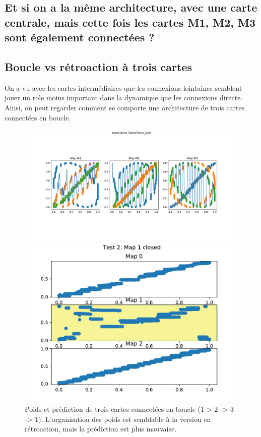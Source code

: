\subsection{Et si on a la même architecture, avec une carte centrale, mais cette fois les cartes M1, M2, M3 sont également connectées ?}



\subsection{Boucle vs rétroaction à trois cartes}
On a vu avec les cartes intermédiaires que les connexions lointaines semblent jouer un role moins important dans la dynamique que les connexions directe. Ainsi, on peut regarder comment se comporte une architecture de trois cartes connectées en boucle.

\begin{figure}
\begin{minipage}{0.5\textwidth}
\includegraphics[width=\textwidth]{3som_loop_w.pdf}

\end{minipage}
\begin{minipage}{0.5\textwidth}
\includegraphics[width=\textwidth]{3som_loop_pred.pdf}
\end{minipage}
\caption{Poids et prédiction de trois cartes connectées en boucle (1-> 2 -> 3 -> 1). L'organisation des poids est semblable à la version en rétroaction, mais la prédiction est plus mauvaise.}
\label{fig:3som_loop}
\end{figure}

